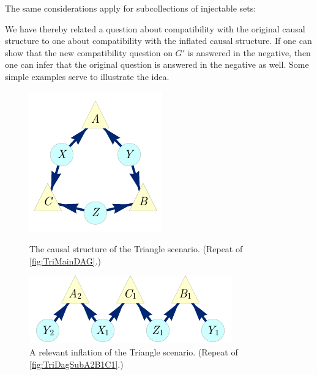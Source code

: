 The same considerations apply for subcollections of injectable sets:


We have thereby related a question about compatibility with the original causal structure to one about compatibility with the inflated causal structure.  If one can show that the new compatibility question on $G'$ is answered in the negative, then one can infer that the original question is answered in the negative as well.    Some simple examples serve to illustrate the idea.





\par\smallskip\nobreak
\begin{figure}[bh]
\centering
\begin{minipage}[t]{0.45\linewidth}
\centering
\includegraphics[scale=1]{TriDagRawALT.pdf}
\caption{The causal structure of the Triangle scenario. (Repeat of \cref{fig:TriMainDAG}.)}\label{fig:TriMainDAGv2}
\end{minipage}
\hfill
\begin{minipage}[t]{0.45\linewidth}
\centering
\includegraphics[scale=1]{TriDagSubA2B1C1.pdf}
\caption{A relevant inflation of the Triangle scenario. (Repeat of \cref{fig:TriDagSubA2B1C1}.)}\label{fig:TriDagSubA2B1C1v2}
\end{minipage}
\end{figure}


